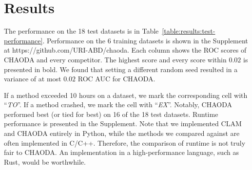 \section{Results}
\label{sec:results}

The performance on the 18 test datasets is in Table~\ref{table:results:test-performance}.
Performance on the 6 training datasets is shown in the Supplement at https://github.com/URI-ABD/chaoda.
Each column shows the ROC scores of CHAODA and every competitor.
The highest score and every score within $0.02$ is presented in bold.
We found that setting a different random seed resulted in a variance of at most $0.02$ ROC AUC for CHAODA.

If a method exceeded 10 hours on a dataset, we mark the corresponding cell with ``\textit{TO}''.
If a method crashed, we mark the cell with ``\textit{EX}''.
Notably, CHAODA performed best (or tied for best) on 16 of the 18 test datasets.
Runtime performance is presented in the Supplement. 
Note that we implemented CLAM and CHAODA entirely in Python, while the methods we compared against are often implemented in C/C++.
Therefore, the comparison of runtime is not truly fair to CHAODA.
An implementation in a high-performance language, such as Rust, would be worthwhile.

